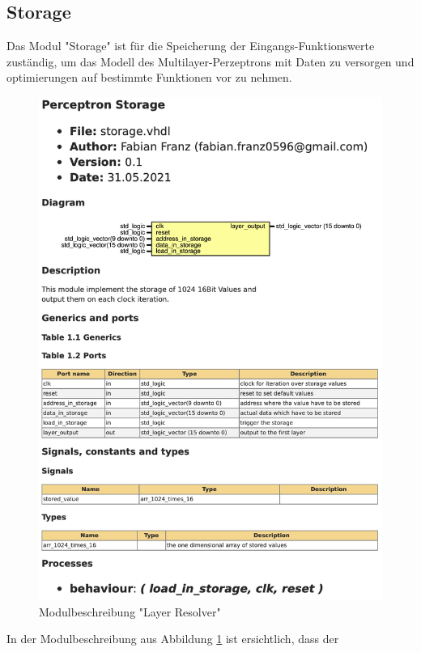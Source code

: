 \documentclass{article}
\numberwithin{equation}{section}
\begin{document}
\subsection{Storage}
Das Modul "Storage" ist für die Speicherung der Eingangs-Funktionswerte zuständig, um das 
Modell des Multilayer-Perzeptrons mit Daten zu versorgen und optimierungen auf bestimmte 
Funktionen vor zu nehmen.
\begin{figure}[htb!]
    \begin{center}
      \includegraphics[width=13.25cm]{ModuleDescription/storage.png}
    \end{center}
    \caption{Modulbeschreibung "Layer Resolver"} \label{fig:storage}
  \end{figure}
\FloatBarrier
\pagebreak
In der Modulbeschreibung aus Abbildung \ref{fig:storage} ist ersichtlich, dass der 
\end{document}

